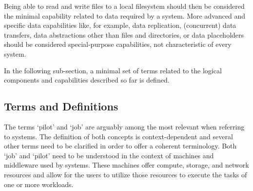\documentclass{sig-alternate}
\begin{document}

Being able to read and write files to a local filesystem should then be
considered the minimal capability related to data required by a \pilotjob
system. More advanced and specific data capabilities like, for example, data
replication, (concurrent) data transfers, data abstractions other than files and
directories, or data placeholders should be considered special-purpose
capabilities, not characteristic of every \pilotjob system.


In the following sub-section, a minimal set of terms related to the logical
components and capabilities described so far is defined.

\subsection{Terms and Definitions}
\label{sec:termsdefs}


The terms `pilot' and `job' are arguably among the most relevant when referring
to \pilotjob systems. The definition of both concepts is context-dependent and
several other terms need to be clarified in order to offer a coherent
terminology. Both `job' and `pilot' need to be understood in the context of
machines and middleware used by \pilotjob systems. These machines offer compute,
storage, and network resources and \pilots allow for the users to utilize those
resources to execute the tasks of one or more workloads.
\end{document}
